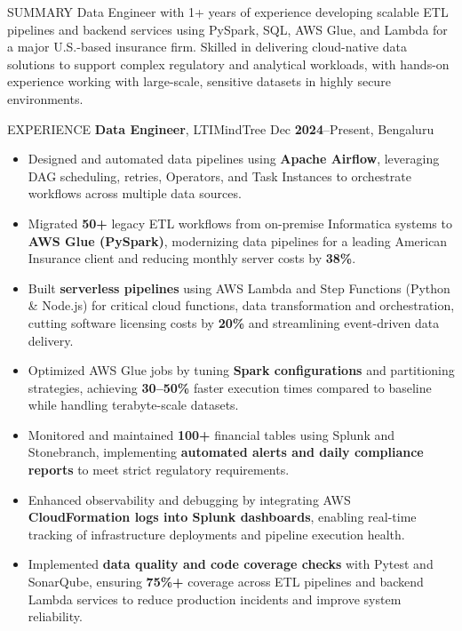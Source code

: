\documentclass[10pt]{resume}
\begin{document}
\small

\begin{rSection}{SUMMARY}
Data Engineer with 1+ years of experience developing scalable ETL pipelines and backend services using PySpark, SQL, AWS Glue, and Lambda for a major U.S.-based insurance firm. Skilled in delivering cloud-native data solutions to support complex regulatory and analytical workloads, with hands-on experience working with large-scale, sensitive datasets in highly secure environments.
\end{rSection}



\begin{rSection}{EXPERIENCE}
\textbf{Data Engineer}, LTIMindTree \hfill Dec \textbf{2024}–Present, Bengaluru
\begin{itemize}
  \item Designed and automated data pipelines using \textbf{Apache Airflow}, leveraging DAG scheduling, retries, Operators, and Task Instances to orchestrate workflows across multiple data sources.
  \item Migrated \textbf{50+} legacy ETL workflows from on-premise Informatica systems to \textbf{AWS Glue (PySpark)}, modernizing data pipelines for a leading American Insurance client and reducing monthly server costs by \textbf{38\%}.
  \item Built \textbf{serverless pipelines} using AWS Lambda and Step Functions (Python \& Node.js) for critical cloud functions, data transformation and orchestration, cutting software licensing costs by \textbf{20\%} and streamlining event-driven data delivery.
  \item Optimized AWS Glue jobs by tuning \textbf{Spark configurations} and partitioning strategies, achieving \textbf{30–50\%} faster execution times compared to baseline while handling terabyte-scale datasets.
  \item Monitored and maintained \textbf{100+} financial tables using Splunk and Stonebranch, implementing \textbf{automated alerts and daily compliance reports} to meet strict regulatory requirements.
  \item Enhanced observability and debugging by integrating AWS \textbf{CloudFormation logs into Splunk dashboards}, enabling real-time tracking of infrastructure deployments and pipeline execution health.
  \item Implemented \textbf{data quality and code coverage checks} with Pytest and SonarQube, ensuring \textbf{75\%+} coverage across ETL pipelines and backend Lambda services to reduce production incidents and improve system reliability.

\end{itemize}
\end{rSection}
\end{document}
